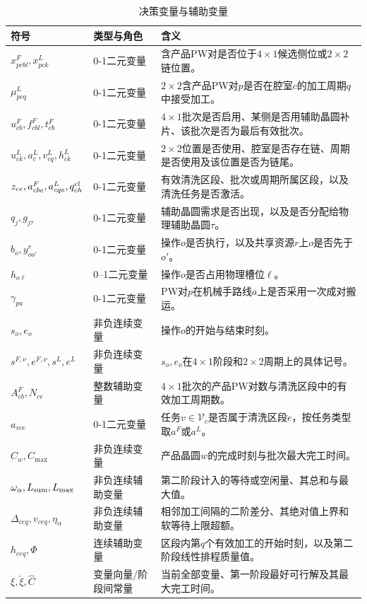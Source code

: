 \documentclass[final,5p,times,twocolumn]{elsarticle}
\begin{document}
\begin{table}[t]
\centering
\scriptsize
\setlength{\tabcolsep}{2.5pt}
\caption{决策变量与辅助变量}
\label{tab:symbol-cn-b}
\begin{tabular}{p{}p{}p{}}
\toprule
符号 & 类型与角色 & 含义 \\
\midrule
$x^F_{pcbl},x^L_{pck}$ & 0-1二元变量 & 含产品PW对是否位于$4\times1$候选侧位或$2\times2$链位置。\\
$\mu^L_{pcq}$ & 0-1二元变量 & $2\times2$含产品PW对$p$是否在腔室$c$的加工周期$q$中接受加工。\\
$u^F_{cb},f^F_{cbl},t^F_{cb}$ & 0-1二元变量 & $4\times1$批次是否启用、某侧是否用辅助晶圆补片、该批次是否为最后有效批次。\\
$u^L_{ck},a^L_c,v^L_{cq},h^L_{ck}$ & 0-1二元变量 & $2\times2$位置是否使用、腔室是否存在链、周期是否使用及该位置是否为链尾。\\
$z_{ce},a^F_{cbe},a^L_{cqe},q^{\rm cl}_{ch}$ & 0-1二元变量 & 有效清洗区段、批次或周期所属区段，以及清洗任务是否激活。\\
$q_j,g_{j\tau}$ & 0-1二元变量 & 辅助晶圆需求是否出现，以及是否分配给物理辅助晶圆$\tau$。\\
$b_o,y^r_{oo'}$ & 0-1二元变量 & 操作$o$是否执行，以及共享资源$r$上$o$是否先于$o'$。\\
$h_{o\ell}$ & 0--1二元变量 & 操作$o$是否占用物理槽位$\ell$。\\
$\gamma_{pa}$ & 0-1二元变量 & PW对$p$在机械手路线$a$上是否采用一次成对搬运。\\
$s_o,e_o$ & 非负连续变量 & 操作$o$的开始与结束时刻。\\
$s^{F,\nu},e^{F,\nu},s^L,e^L$ & 非负连续变量 & $s_o,e_o$在$4\times1$阶段和$2\times2$周期上的具体记号。\\
$A^F_{cb},N_{ce}$ & 整数辅助变量 & $4\times1$批次的产品PW对数与清洗区段中的有效加工周期数。\\
$a_{vce}$ & 0-1二元变量 & 任务$v\in\mathcal V_c$是否属于清洗区段$e$，按任务类型取$a^F$或$a^L$。\\
$C_w,C_{\max}$ & 非负连续变量 & 产品晶圆$w$的完成时刻与批次最大完工时间。\\
$\omega_\alpha,L_{\rm sum},L_{\max}$ & 非负连续辅助变量 & 第二阶段计入的等待或空闲量、其总和与最大值。\\
$\Delta_{ceq},v_{ceq},\eta_\alpha$ & 非负连续辅助变量 & 相邻加工间隔的二阶差分、其绝对值上界和软等待上限超额。\\
$h_{ceq},\Phi$ & 连续辅助变量 & 区段内第$q$个有效加工的开始时刻，以及第二阶段线性排程质量值。\\
$\xi,\widehat\xi,\widehat C$ & 变量向量/阶段间常量 & 当前全部变量、第一阶段最好可行解及其最大完工时间。\\
\bottomrule
\end{tabular}
\end{table}
\end{document}
